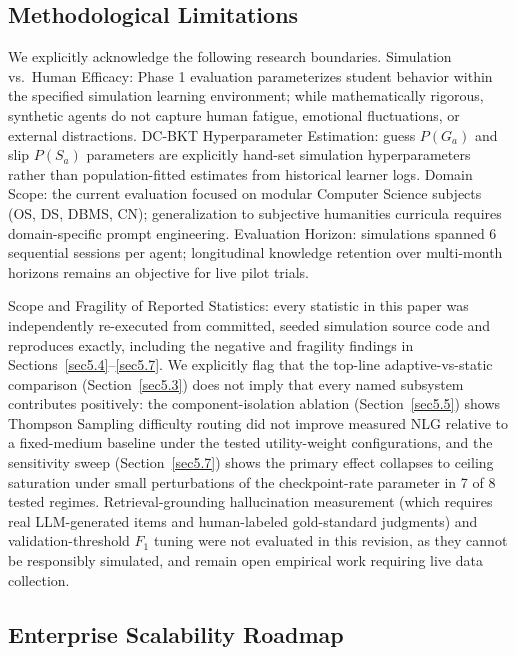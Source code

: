 \documentclass[pdflatex,sn-apa]{sn-jnl}
\begin{document}
\subsection{Methodological Limitations}\label{sec6.2}

We explicitly acknowledge the following research boundaries. Simulation vs.\ Human Efficacy: Phase 1 evaluation parameterizes student behavior within the specified simulation learning environment; while mathematically rigorous, synthetic agents do not capture human fatigue, emotional fluctuations, or external distractions. DC-BKT Hyperparameter Estimation: guess $P(G_a)$ and slip $P(S_a)$ parameters are explicitly hand-set simulation hyperparameters rather than population-fitted estimates from historical learner logs. Domain Scope: the current evaluation focused on modular Computer Science subjects (OS, DS, DBMS, CN); generalization to subjective humanities curricula requires domain-specific prompt engineering. Evaluation Horizon: simulations spanned 6 sequential sessions per agent; longitudinal knowledge retention over multi-month horizons remains an objective for live pilot trials.

Scope and Fragility of Reported Statistics: every statistic in this paper was independently re-executed from committed, seeded simulation source code and reproduces exactly, including the negative and fragility findings in Sections~\ref{sec5.4}--\ref{sec5.7}. We explicitly flag that the top-line adaptive-vs-static comparison (Section~\ref{sec5.3}) does not imply that every named subsystem contributes positively: the component-isolation ablation (Section~\ref{sec5.5}) shows Thompson Sampling difficulty routing did not improve measured NLG relative to a fixed-medium baseline under the tested utility-weight configurations, and the sensitivity sweep (Section~\ref{sec5.7}) shows the primary effect collapses to ceiling saturation under small perturbations of the checkpoint-rate parameter in 7 of 8 tested regimes. Retrieval-grounding hallucination measurement (which requires real LLM-generated items and human-labeled gold-standard judgments) and validation-threshold $F_1$ tuning were not evaluated in this revision, as they cannot be responsibly simulated, and remain open empirical work requiring live data collection.

\subsection{Enterprise Scalability Roadmap}\label{sec6.3}
\end{document}
